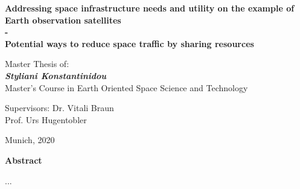 \vspace{3cm}
\begin{center}
\Large{\textbf{Addressing space infrastructure needs and utility on the example of Earth observation satellites \\- \\}}
\Large{\textbf{Potential ways to reduce space traffic by sharing resources}}
\end{center}
\vspace{2.1cm}
\begin{center}
\large{Master Thesis of:\\
\textit{\textbf{Styliani Konstantinidou}} \\}
\vspace{1cm}
\large{Master's Course in Earth Oriented Space Science and Technology}
\end{center}

\vspace{2.5cm}
\begin{flushleft}
\large{Supervisors: Dr. Vitali Braun \\ \hspace*{2.7cm}Prof. Urs Hugentobler}
\end{flushleft}

\vfill
\begin{center}
\normalsize Munich, 2020
\end{center}



\newpage \mbox{} %
\newpage \mbox{}
\thispagestyle{empty}
\begin{center}
\Large{\textbf{Abstract}} 
\end{center}
\bigskip
\par 	
...
% 

%
%



